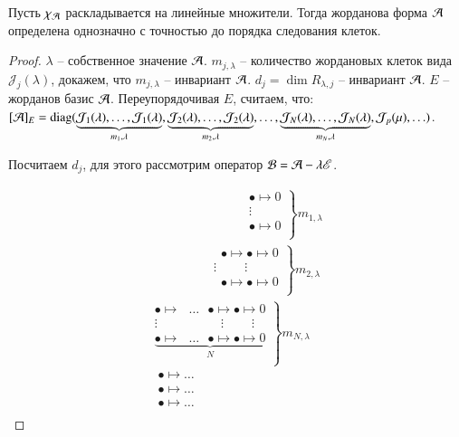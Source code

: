 \documentclass[main]{subfiles}
\begin{document}
\begin{proposition}
  Пусть $\chi_{\mathcal{A}}$ раскладывается на линейные множители. Тогда жорданова форма $\mathcal{A}$
  определена однозначно с точностью до порядка следования клеток.
\end{proposition}

\begin{proof}
  $\lambda$ -- собственное значение $\mathcal{A}$. $m_{j, \lambda}$ -- количество жордановых клеток вида
  $\mathcal{J}_j(\lambda)$, докажем, что $m_{j, \lambda}$ -- инвариант $\mathcal{A}$. $d_j = \dim R_{\lambda, j}$ -- инвариант $\mathcal{A}$.
  $E$ -- жорданов базис $\mathcal{A}$. Переупорядочивая $E$, считаем, что:
  $[\mathcal{A}]_E = \operatorname{diag}(\underbrace{\mathcal{J}_1(\lambda), \ldots, \mathcal{J}_1(\lambda)}_{m_1, \lambda}, \underbrace{\mathcal{J}_2(\lambda), \ldots, \mathcal{J}_2(\lambda)}_{m_2, \lambda}, \ldots, \underbrace{\mathcal{J}_N(\lambda), \ldots, \mathcal{J}_N(\lambda)}_{m_N, \lambda}, \mathcal{J}_p(\mu), \ldots)$.



\newpage

Посчитаем $d_j$, для этого рассмотрим оператор $\mathcal{B} = \mathcal{A} - \lambda \mathscr{E}$.

\begin{gather*}
  \left.
  \begin{array}{ccc}
    \ \quad \quad \quad \quad \quad \quad \quad \ \bullet\longmapsto 0 \\
    \ \quad \quad \quad \quad \quad \quad \quad \ \vdots               \\
    \ \quad \quad \quad \quad \quad \quad \quad \ \bullet\longmapsto 0 \\
  \end{array}
  \right\} m_{1,\lambda} \\
  \left.
  \begin{array}{ccc}
    \ \quad \quad \quad \quad \quad \bullet \longmapsto \bullet \longmapsto 0  \\
    \ \quad \quad \quad \quad \ \ \vdots \quad \quad \ \vdots                  \\
    \ \quad \quad \quad \quad \quad  \bullet \longmapsto \bullet \longmapsto 0 \\
  \end{array}
  \right\} m_{2,\lambda} \\
  \left.
  \begin{array}{ccc}
    \bullet \longmapsto \ \ \  \dots \ \ \  \bullet\longmapsto\bullet\longmapsto 0                 \\
    \vdots \quad \quad \quad \quad \quad  \vdots \quad \quad \ \vdots                              \\
    \underbrace{\bullet\longmapsto \ \ \  \dots \ \ \  \bullet\longmapsto\bullet\longmapsto 0}_{N} \\
  \end{array}
  \right\} m_{N,\lambda} \\
  \text{ } \bullet\longmapsto \dots \\
  \text{ } \bullet\longmapsto \dots \\
  \text{ } \bullet\longmapsto \dots \\
\end{gather*}


\end{proof}
\end{document}
